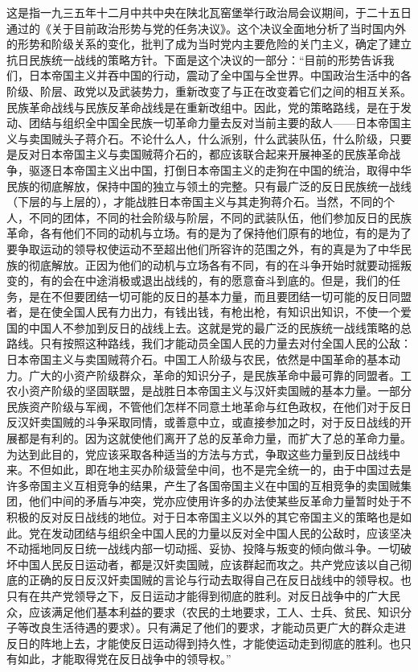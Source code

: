 \begin{maonote}
这是指一九三五年十二月中共中央在陕北瓦窑堡举行政治局会议期间，于二十五日通过的《关于目前政治形势与党的任务决议》。这个决议全面地分析了当时国内外的形势和阶级关系的变化，批判了成为当时党内主要危险的关门主义，确定了建立抗日民族统一战线的策略方针。下面是这个决议的一部分：“目前的形势告诉我们，日本帝国主义并吞中国的行动，震动了全中国与全世界。中国政治生活中的各阶级、阶层、政党以及武装势力，重新改变了与正在改变着它们之间的相互关系。民族革命战线与民族反革命战线是在重新改组中。因此，党的策略路线，是在于发动、团结与组织全中国全民族一切革命力量去反对当前主要的敌人——日本帝国主义与卖国贼头子蒋介石。不论什么人，什么派别，什么武装队伍，什么阶级，只要是反对日本帝国主义与卖国贼蒋介石的，都应该联合起来开展神圣的民族革命战争，驱逐日本帝国主义出中国，打倒日本帝国主义的走狗在中国的统治，取得中华民族的彻底解放，保持中国的独立与领土的完整。只有最广泛的反日民族统一战线（下层的与上层的），才能战胜日本帝国主义与其走狗蒋介石。当然，不同的个人，不同的团体，不同的社会阶级与阶层，不同的武装队伍，他们参加反日的民族革命，各有他们不同的动机与立场。有的是为了保持他们原有的地位，有的是为了要争取运动的领导权使运动不至超出他们所容许的范围之外，有的真是为了中华民族的彻底解放。正因为他们的动机与立场各有不同，有的在斗争开始时就要动摇叛变的，有的会在中途消极或退出战线的，有的愿意奋斗到底的。但是，我们的任务，是在不但要团结一切可能的反日的基本力量，而且要团结一切可能的反日同盟者，是在使全国人民有力出力，有钱出钱，有枪出枪，有知识出知识，不使一个爱国的中国人不参加到反日的战线上去。这就是党的最广泛的民族统一战线策略的总路线。只有按照这种路线，我们才能动员全国人民的力量去对付全国人民的公敌：日本帝国主义与卖国贼蒋介石。中国工人阶级与农民，依然是中国革命的基本动力。广大的小资产阶级群众，革命的知识分子，是民族革命中最可靠的同盟者。工农小资产阶级的坚固联盟，是战胜日本帝国主义与汉奸卖国贼的基本力量。一部分民族资产阶级与军阀，不管他们怎样不同意土地革命与红色政权，在他们对于反日反汉奸卖国贼的斗争采取同情，或善意中立，或直接参加之时，对于反日战线的开展都是有利的。因为这就使他们离开了总的反革命力量，而扩大了总的革命力量。为达到此目的，党应该采取各种适当的方法与方式，争取这些力量到反日战线中来。不但如此，即在地主买办阶级营垒中间，也不是完全统一的，由于中国过去是许多帝国主义互相竞争的结果，产生了各国帝国主义在中国的互相竞争的卖国贼集团，他们中间的矛盾与冲突，党亦应使用许多的办法使某些反革命力量暂时处于不积极的反对反日战线的地位。对于日本帝国主义以外的其它帝国主义的策略也是如此。党在发动团结与组织全中国人民的力量以反对全中国人民的公敌时，应该坚决不动摇地同反日统一战线内部一切动摇、妥协、投降与叛变的倾向做斗争。一切破坏中国人民反日运动者，都是汉奸卖国贼，应该群起而攻之。共产党应该以自己彻底的正确的反日反汉奸卖国贼的言论与行动去取得自己在反日战线中的领导权。也只有在共产党领导之下，反日运动才能得到彻底的胜利。对反日战争中的广大民众，应该满足他们基本利益的要求（农民的土地要求，工人、士兵、贫民、知识分子等改良生活待遇的要求）。只有满足了他们的要求，才能动员更广大的群众走进反日的阵地上去，才能使反日运动得到持久性，才能使运动走到彻底的胜利。也只有如此，才能取得党在反日战争中的领导权。”

\end{maonote}
